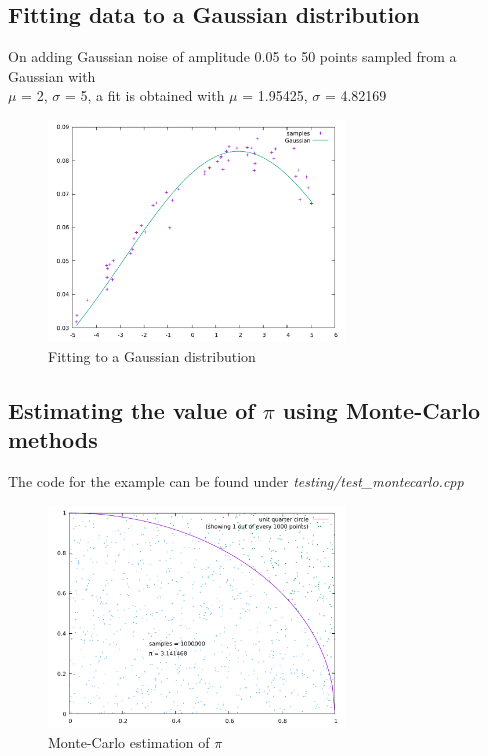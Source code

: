 \documentclass[titlepage, 11pt]{article}
\begin{document}
\subsection{Fitting data to a Gaussian distribution}
On adding Gaussian noise of amplitude 0.05 to 50 points sampled from a Gaussian with \\$\mu$ = 2, $\sigma$ = 5, a 
fit is obtained with $\mu$ = 1.95425, $\sigma$ = 4.82169
\begin{figure}[!ht]
    \centering
    \includegraphics[width=0.7\textwidth]{images/fit_gaussian.pdf}
    \caption{Fitting to a Gaussian distribution}
    \label{fig:example-curve-fitting-gaussian}
\end{figure}

\subsection{\texorpdfstring{Estimating the value of $\pi$ using Monte-Carlo methods}{Estimating the value of pi using Monte-Carlo methods}}
The code for the example can be found under \textit{testing/test\_montecarlo.cpp}
\begin{figure}[!ht]
    \centering
    \includegraphics[width=0.7\textwidth]{images/monte_carlo_pi.pdf}
    \caption{Monte-Carlo estimation of $\pi$}
    \label{fig:example-monte-carlo-pi}
\end{figure}
\end{document}
